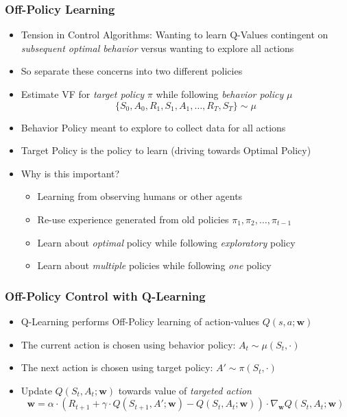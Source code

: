 \documentclass[handout]{beamer}
\begin{document}
\begin{frame}
\frametitle{Off-Policy Learning}
\pause
\begin{itemize}[<+->]
\item Tension in Control Algorithms: Wanting to learn Q-Values contingent on {\em subsequent optimal behavior} versus wanting to explore all actions
\item So separate these concerns into two different policies 
\item Estimate VF for {\em target policy} $\pi$  while following {\em behavior policy} $\mu$
$$\{S_0, A_0, R_1, S_1, A_1, \ldots, R_T, S_T\} \sim \mu$$
\item Behavior Policy meant to explore to collect data for all actions
\item Target Policy is the policy to learn (driving towards Optimal Policy)
\item Why is this important?
\begin{itemize}[<+->]
\item Learning from observing  humans or other agents
\item Re-use experience generated from  old policies  $\pi_1, \pi_2, \ldots, \pi_{t-1}$
\item Learn about {\em optimal} policy while following {\em exploratory} policy
\item Learn about {\em multiple} policies while following {\em one} policy
\end{itemize}
\end{itemize}
\end{frame}

\begin{frame}
\frametitle{Off-Policy Control with Q-Learning}
\pause
\begin{itemize}[<+->]
\item Q-Learning performs Off-Policy learning of action-values $Q(s,a;\bm{w})$
\item The current action is chosen using behavior policy: $A_t \sim \mu(S_t,\cdot)$
\item The next action is chosen using target policy: $A' \sim \pi(S_t, \cdot)$
\item Update $Q(S_t, A_t;\bm{w})$ towards value of {\em targeted action}
$$\bm{w} = \alpha \cdot (R_{t+1} + \gamma \cdot Q(S_{t+1}, A'; \bm{w}) - Q(S_t, A_t; \bm{w})) \cdot \nabla_{\bm{w}} Q(S_t, A_t; \bm{w})$$ 
\end{itemize}
\end{frame}
\end{document}
